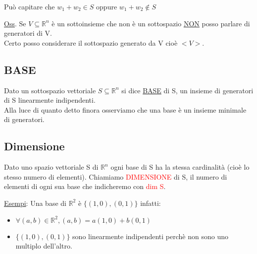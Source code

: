 \begin{minipage}{.45\linewidth}
\textsf{\small Può capitare che $w_1 + w_2 \in S$ oppure $w_1 + w_2 \notin S$}
\end{minipage}
\textsf{\small \underline{Oss}. Se $V \subseteq \mathbb{R}^n$ è un sottoinsieme che non è un sottospazio \underline{\underline{NON}} posso parlare di generatori di V.}\\
\textsf{\small Certo posso considerare il sottospazio generato da V cioè $ <V>$.}\\


\newpage

\subsection{BASE}

\begin{definition}[Base]
	Dato un sottospazio vettoriale $S \subseteq \mathbb{R}^n$ si dice \underline{BASE} di S, un insieme di generatori di S linearmente indipendenti.\\
	Alla luce di quanto detto finora osserviamo che una base è un insieme minimale di generatori.
\end{definition}

\subsection{Dimensione}

\begin{theorem}
	Dato uno spazio vettoriale S di $\mathbb{R}^n$ ogni base di S ha la stessa cardinalità (cioè lo stesso numero di elementi). Chiamiamo \textcolor{red}{DIMENSIONE} di S, il numero di elementi di ogni sua base che indicheremo con \textcolor{red}{dim S}.
\end{theorem}

\textsf{\underline{Esempi}: Una base di $\mathbb{R}^2$ è $\{ (1,0),(0,1)\}$ infatti:}\\
\begin{itemize}
	\item \textsf{\small $\forall (a,b) \in \mathbb{R}^2, (a,b) = a(1,0) + b(0,1)$}
	\item \textsf{\small $\{ (1,0),(0,1)\}$ sono linearmente indipendenti perchè $\boxed{\text{non}}$ sono uno multiplo dell'altro.}
\end{itemize}

